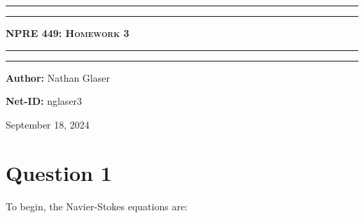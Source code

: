 \documentclass{article}
\begin{document}
\begin{titlepage}

\centering
\scshape
\vspace{\baselineskip}

%
\rule{\textwidth}{1.6pt}\vspace*{-\baselineskip}\vspace*{2pt}
\rule{\textwidth}{0.4pt}

{\Huge \textbf{\textsc{NPRE 449: Homework 3 \\
\vspace{15pt}}}}

\rule{\textwidth}{0.4pt}\vspace*{-\baselineskip}\vspace{3.2pt}
\rule{\textwidth}{1.6pt}\vspace{6pt}
\vspace{1.5\baselineskip}


\large \centerline{\textbf{Author:} Nathan Glaser}
\large \centerline{\textbf{Net-ID:} nglaser3}
\quad

\vfill
\large \centerline{September 18, 2024}
%
\end{titlepage}

\tableofcontents
\newpage
{}

\newcommand{\leftrightharpoonup}{\mathrel{\mathpalette\lrhup\relax}}
\newcommand{\lrhup}[2]{\ooalign{$#1\leftharpoonup$\cr$#1\rightharpoonup$\cr}}
\newcommand{\pd}[3]{\frac{\partial^{#3}#1}{\partial#2^{#3}}}
\newcommand{\phase}{\left(\Vec{r},t\right)}
\newcommand*\vect[1]{\mkern2mu\accentset{\rightharpoonup}{#1}\mkern2mu}
\newcommand*\tensor[1]{\mkern2mu\accentset{\leftrightharpoonup}{#1}\mkern2mu}
\renewcommand{\Vec}[1]{\vect{#1}}
\newcommand{\stress}{\tensor{\mathbf{\tau}}}

\newcommand{\mass}{\pd{\rho}{t}{} + \nabla\cdot\rho\Vec{v} = 0}
\newcommand{\momentum}{\pd{\rho\Vec{v}}{t}{} + \nabla \cdot \rho\Vec{v}\Vec{v}=-\nabla P + \nabla \cdot \stress+\rho \Vec{g}}
\newcommand{\energy}{\pd{\rho u}{t}{} + \nabla\cdot\rho\Vec{v}u 
        =
        -\nabla\cdot q'' - P\nabla\cdot\Vec{v} + \stress\mathbf{:}\nabla\Vec{v}+q'''}
        
\section*{Question 1}
To begin, the Navier-Stokes equations are:
\end{document}
